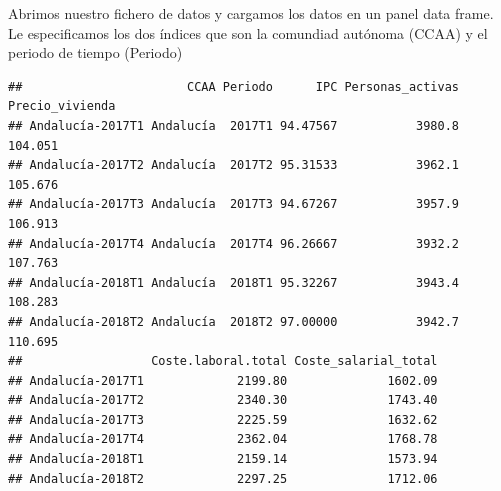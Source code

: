 \documentclass[
]{article}
\newenvironment{Shaded}{\begin{snugshade}}{\end{snugshade}}
\newcommand{\AttributeTok}[1]{\textcolor[rgb]{0.77,0.63,0.00}{#1}}
\newcommand{\CommentTok}[1]{\textcolor[rgb]{0.56,0.35,0.01}{\textit{#1}}}
\newcommand{\ConstantTok}[1]{\textcolor[rgb]{0.00,0.00,0.00}{#1}}
\newcommand{\FunctionTok}[1]{\textcolor[rgb]{0.00,0.00,0.00}{#1}}
\newcommand{\NormalTok}[1]{#1}
\newcommand{\OtherTok}[1]{\textcolor[rgb]{0.56,0.35,0.01}{#1}}
\newcommand{\SpecialCharTok}[1]{\textcolor[rgb]{0.00,0.00,0.00}{#1}}
\newcommand{\StringTok}[1]{\textcolor[rgb]{0.31,0.60,0.02}{#1}}
\begin{document}
Abrimos nuestro fichero de datos y cargamos los datos en un panel data
frame. Le especificamos los dos índices que son la comundiad autónoma
(CCAA) y el periodo de tiempo (Periodo)

\begin{Shaded}
\end{Shaded}

\begin{verbatim}
##                       CCAA Periodo      IPC Personas_activas Precio_vivienda
## Andalucía-2017T1 Andalucía  2017T1 94.47567           3980.8         104.051
## Andalucía-2017T2 Andalucía  2017T2 95.31533           3962.1         105.676
## Andalucía-2017T3 Andalucía  2017T3 94.67267           3957.9         106.913
## Andalucía-2017T4 Andalucía  2017T4 96.26667           3932.2         107.763
## Andalucía-2018T1 Andalucía  2018T1 95.32267           3943.4         108.283
## Andalucía-2018T2 Andalucía  2018T2 97.00000           3942.7         110.695
##                  Coste.laboral.total Coste_salarial_total
## Andalucía-2017T1             2199.80              1602.09
## Andalucía-2017T2             2340.30              1743.40
## Andalucía-2017T3             2225.59              1632.62
## Andalucía-2017T4             2362.04              1768.78
## Andalucía-2018T1             2159.14              1573.94
## Andalucía-2018T2             2297.25              1712.06
\end{verbatim}
\end{document}
